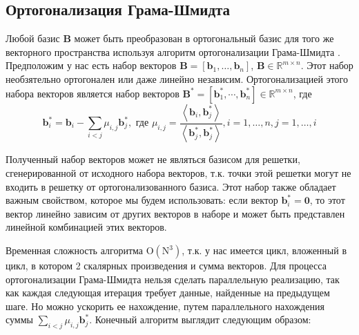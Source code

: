 \subsection{Ортогонализация Грама-Шмидта}

Любой базис $ \mathbf{B} $ может быть преобразован в ортогональный базис для того же векторного пространства используя алгоритм ортогонализации Грама-Шмидта \cite{lec1}.
Предположим у нас есть набор векторов $ \mathbf{B} = [\mathbf{b}_1, \ldots, \mathbf{b}_n] $, $ \mathbf{B} \in \mathbb{R}^{m \times n} $. Этот набор необзятельно ортогонален или даже линейно независим. Ортогонализацией этого набора векторов является набор векторов $ \mathbf{B}^* = [\mathbf{b}^*_1, \cdots, \mathbf{b}^*_n] \in \mathbb{R}^{m \times n} $, где $$ \mathbf{b}^*_i = \mathbf{b}_i - \sum_{i < j} \mu_{i, j} \mathbf{b}^*_j, \text{ где } \mu_{i, j} = \frac{\left\langle \mathbf{b}_i, \mathbf{b}^*_j \right\rangle}{\left\langle \mathbf{b}^*_j, \mathbf{b}^*_j \right\rangle}, i = 1, \ldots, n, j = 1, \ldots, i $$

Полученный набор векторов может не являться базисом для решетки, сгенерированной от исходного набора векторов, т.к. точки этой решетки могут не входить в решетку от ортогонализованного базиса. Этот набор также обладает важным свойством, которое мы будем использовать: если вектор $ \mathbf{b}^*_i = \mathbf{0} $, то этот вектор линейно зависим от других векторов в наборе и может быть представлен линейной комбинацией этих векторов.

Временная сложность алгоритма $ \mathrm{O(N^3)} $, т.к. у нас имеется цикл, вложенный в цикл, в котором 2 скалярных произведения и сумма векторов. Для процесса ортогонализации Грама-Шмидта нельзя сделать параллельную реализацию, так как каждая следующая итерация требует данные, найденные на предыдущем шаге. Но можно ускорить ее нахождение, путем параллельного нахождения суммы $ \sum_{i < j} \mu_{i, j} \mathbf{b}^*_j $. Конечный алгоритм выглядит следующим образом:

\begin{algorithmic}

	
	\EndFor
	
\EndFor
\end{algorithmic}


